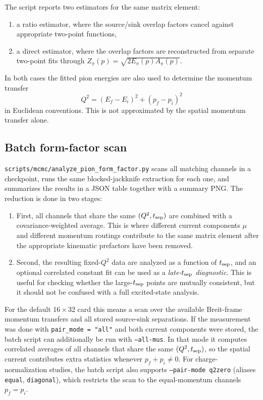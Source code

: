 \documentclass[11pt]{article}
\begin{document}
The script reports two estimators for the same matrix element:
\begin{enumerate}
  \item a ratio estimator, where the source/sink overlap factors cancel
  against appropriate two-point functions,
  \item a direct estimator, where the overlap factors are reconstructed from
  separate two-point fits through
  $Z_\pi(p)=\sqrt{2E_\pi(p)A_\pi(p)}$.
\end{enumerate}
In both cases the fitted pion energies are also used to determine the momentum
transfer
\begin{equation}
  Q^2 = (E_f-E_i)^2 + (p_f-p_i)^2
\end{equation}
in Euclidean conventions. This is not approximated by the spatial momentum
transfer alone.

\subsection{Batch form-factor scan}
\texttt{scripts/mcmc/analyze\_pion\_form\_factor.py} scans all matching
channels in a checkpoint, runs the same blocked-jackknife extraction for each
one, and summarizes the results in a JSON table together with a summary PNG.
The reduction is done in two stages:
\begin{enumerate}
  \item First, all channels that share the same $(Q^2,t_{\rm sep})$ are
  combined with a covariance-weighted average. This is where different current
  components $\mu$ and different momentum routings contribute to the same
  matrix element after the appropriate kinematic prefactors have been removed.
  \item Second, the resulting fixed-$Q^2$ data are analyzed as a function of
  $t_{\rm sep}$, and an optional correlated constant fit can be used as a
  \emph{late-$t_{\rm sep}$ diagnostic}. This is useful for checking whether the
  large-$t_{\rm sep}$ points are mutually consistent, but it should not be
  confused with a full excited-state analysis.
\end{enumerate}
For the default 16\,$\times$\,32 card this means a scan over the available
Breit-frame momentum transfers and all stored source-sink separations. If the
measurement was done with \texttt{pair\_mode = "all"} and both current
components were stored, the batch script can additionally be run with
\texttt{--all-mus}. In that mode it computes correlated averages of all channels
that share the same $(Q^2,t_{\rm sep})$, so the spatial current contributes
extra statistics whenever $p_f+p_i\neq 0$.
For charge-normalization studies, the batch script also supports
\texttt{--pair-mode q2zero} (aliases \texttt{equal}, \texttt{diagonal}),
which restricts the scan to the equal-momentum channels $p_f=p_i$.
\end{document}
